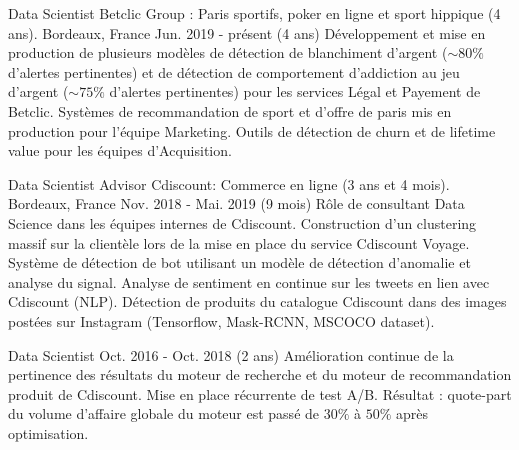
\begin{cventries}

  \cventry
    {Data Scientist} %
    {Betclic Group : Paris sportifs, poker en ligne et sport hippique (4 ans).} %
    {Bordeaux, France} %
    {Jun. 2019 - présent (4 ans)} %
    {
    Développement et mise en production de plusieurs modèles de détection de blanchiment d'argent ($\sim80\%$ d'alertes pertinentes) et de détection de comportement d'addiction au jeu d'argent ($\sim75\%$ d'alertes pertinentes) pour les services Légal et Payement de Betclic.\newline
    Systèmes de recommandation de sport et d'offre de paris mis en production pour l'équipe Marketing.\newline
    Outils de détection de churn et de lifetime value pour les équipes d'Acquisition.
    }

  \cventry
    {Data Scientist Advisor} %
    {Cdiscount: Commerce en ligne (3 ans et 4 mois).} %
    {Bordeaux, France} %
    {Nov. 2018 - Mai. 2019 (9 mois)} %
    {
    Rôle de consultant Data Science dans les équipes internes de Cdiscount. Construction d'un clustering massif sur la clientèle lors de la mise en place du service Cdiscount Voyage.\newline
    Système de détection de bot utilisant un modèle de détection d'anomalie et analyse du signal.\newline
    Analyse de sentiment en continue sur les tweets en lien avec Cdiscount (NLP).\newline
    Détection de produits du catalogue Cdiscount dans des images postées sur Instagram (Tensorflow, Mask-RCNN, MSCOCO dataset).
    }

  \cventry
    {Data Scientist} %
    {} %
    {} %
    {Oct. 2016 - Oct. 2018 (2 ans)} %
    {
    Amélioration continue de la pertinence des résultats du moteur de recherche et du moteur de  recommandation produit de Cdiscount.\newline
    Mise en place récurrente de test A/B.\newline
    Résultat : quote-part du volume d'affaire globale du moteur est passé de $30\%$ à $50\%$ après optimisation.
    }


\end{cventries}
